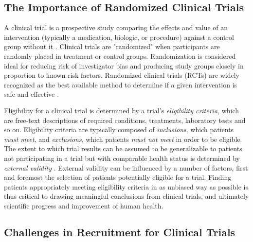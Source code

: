 \documentclass[../main.tex]{subfiles}
\begin{document}
\subsection{The Importance of Randomized Clinical Trials}

A clinical trial is a prospective study comparing the effects and value of an intervention (typically a medication, biologic, or procedure) against a control group without it \cite{friedman2015fundamentals}. Clinical trials are "randomized" when participants are randomly placed in treatment or control groups. Randomization is considered ideal for reducing risk of investigator bias and producing study groups closely in proportion to known risk factors. Randomized clinical trials (RCTs) are widely recognized as the best available method to determine if a given intervention is safe and effective \cite{friedman2015fundamentals}.

Eligibility for a clinical trial is determined by a trial's \textit{eligibility criteria}, which are free-text descriptions of required conditions, treatments, laboratory tests and so on. Eligibility criteria are typically composed of \textit{inclusions}, which patients \textit{must meet}, and \textit{exclusions}, which patients \textit{must not meet} in order to be eligible. The extent to which trial results can be assumed to be generalizable to patients not participating in a trial but with comparable health status is determined by \textit{external validity} \cite{rothwell2005external}. External validity can be influenced by a number of factors, first and foremost the selection of patients potentially eligible for a trial. Finding patients appropriately meeting eligibility criteria in as unbiased way as possible is thus critical to drawing meaningful conclusions from clinical trials, and ultimately scientific progress and improvement of human health.

\subsection{Challenges in Recruitment for Clinical Trials}
\end{document}

